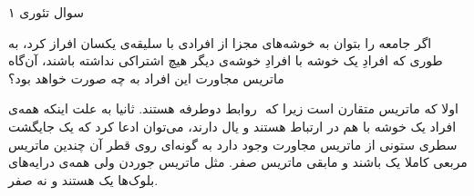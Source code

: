 سوال تئوری ۱

اگر جامعه را بتوان به خوشه‌های مجزا از افرادی با سلیقه‌ی یکسان افراز کرد، به طوری که افرادِ یک خوشه با افرادِ خوشه‌ی دیگر هیچ اشتراکی نداشته باشند، آن‌گاه ماتریس مجاورت این افراد به چه صورت خواهد بود؟

اولا که ماتریس متقارن است زیرا که ‍ روابط دوطرفه هستند. ثانیا به علت اینکه همه‌ی افراد یک خوشه با هم در ارتباط هستند و یال دارند، می‌توان ادعا کرد که یک جایگشت سطری ستونی از ماتریس مجاورت وجود دارد به گونه‌ای روی قطر آن چندین ماتریس مربعی کاملا یک باشند و مابقی ماتریس صفر. مثل ماتریس جوردن ولی همه‌ی درایه‌های بلوک‌ها یک هستند و نه صفر.
